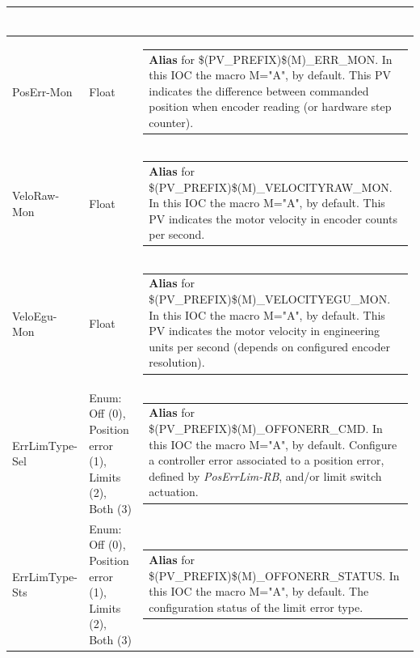 \documentclass[openany]{article}
\begin{document}
\begin{longtable}{| m{4.5cm} m{2.5cm}  m{8.5cm} |}
\begin{tabular}{@{}m{6cm}@{}}
            \end{tabular} \hypertarget{pv:pos-err-mon}{}\\ \hline
        PosErr-Mon & Float & \begin{tabular}{@{}m{6cm}@{}}
                \textbf{\color{blue} Alias} for \$(PV\_PREFIX)\$(M)\_ERR\_MON. In this IOC the macro M="A", by default. This PV indicates the difference between commanded position when encoder reading (or hardware step counter).
            \end{tabular} \hypertarget{pv:velo-raw-mon}{}\\ \hline
        VeloRaw-Mon & Float & \begin{tabular}{@{}m{6cm}@{}}
                \textbf{\color{blue} Alias} for \$(PV\_PREFIX)\$(M)\_VELOCITYRAW\_MON. In this IOC the macro M="A", by default. This PV indicates the motor velocity in encoder counts per second.
            \end{tabular} \hypertarget{pv:velo-egu-mon}{}\\ \hline
        VeloEgu-Mon & Float & \begin{tabular}{@{}m{6cm}@{}}
                \textbf{\color{blue} Alias} for \$(PV\_PREFIX)\$(M)\_VELOCITYEGU\_MON. In this IOC the macro M="A", by default. This PV indicates the motor velocity in engineering units per second (depends on configured encoder resolution).
            \end{tabular} \hypertarget{pv:err-lim-type}{}\\ \hline
        ErrLimType-Sel & Enum: Off (0), Position error (1), Limits (2), Both (3) & \begin{tabular}{@{}m{6cm}@{}}
                \textbf{\color{blue} Alias} for \$(PV\_PREFIX)\$(M)\_OFFONERR\_CMD. In this IOC the macro M="A", by default. Configure a controller error associated to a position error, defined by \emph{PosErrLim-RB}, and/or limit switch actuation.
            \end{tabular} \hypertarget{}{}\\ \hline
        ErrLimType-Sts & Enum: Off (0), Position error (1), Limits (2), Both (3) & \begin{tabular}{@{}m{6cm}@{}}
                \textbf{\color{blue} Alias} for \$(PV\_PREFIX)\$(M)\_OFFONERR\_STATUS. In this IOC the macro M="A", by default. The configuration status of the limit error type.
            \end{tabular} \hypertarget{pv:axis-mon}{}\\ \hline

\end{longtable}
\end{document}
